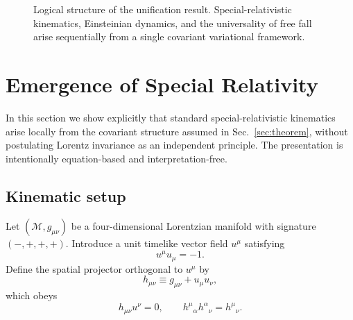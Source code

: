 \documentclass[11pt]{article}
\begin{document}
        \begin{figure}[t]
        \centering
        \caption{Logical structure of the unification result.
        Special-relativistic kinematics, Einsteinian dynamics, and the universality of
        free fall arise sequentially from a single covariant variational framework.}
        \label{fig:unification_flow}
        \end{figure}

    \section{Emergence of Special Relativity}
    \label{sec:sr}

    In this section we show explicitly that standard special-relativistic kinematics
    arise locally from the covariant structure assumed in Sec.~\ref{sec:theorem},
    without postulating Lorentz invariance as an independent principle.
    The presentation is intentionally equation-based and interpretation-free.

    \subsection{Kinematic setup}

        Let $(\mathcal{M},g_{\mu\nu})$ be a four-dimensional Lorentzian manifold with
        signature $(-,+,+,+)$.
        Introduce a unit timelike vector field $u^\mu$ satisfying
        \begin{equation}
            u^\mu u_\mu = -1 .
        \end{equation}
        Define the spatial projector orthogonal to $u^\mu$ by
        \begin{equation}
            h_{\mu\nu} \equiv g_{\mu\nu} + u_\mu u_\nu ,
        \end{equation}
        which obeys
        \begin{equation}
            h_{\mu\nu} u^\nu = 0, \qquad
            h^\mu{}_{\alpha} h^\alpha{}_{\nu} = h^\mu{}_{\nu}.
        \end{equation}
\end{document}
